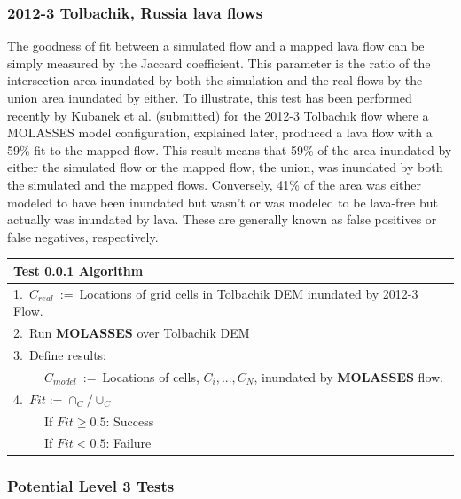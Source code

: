\documentclass[12pt,letter]{article}
\newcommand{\tabitem}{~~\llap{\textbullet}~~}
\newcommand{\tabitem}{~~\llap{\textbullet}~~}
\begin{document}
		\subsubsection{2012-3 Tolbachik, Russia lava flows}\label{test:Real_Tolbachik}
			The goodness of fit between a simulated flow and a mapped lava flow can be simply measured by the Jaccard coefficient. This parameter is the ratio of the intersection area inundated by both the simulation and the real flows by the union area inundated by either. To illustrate, this test has been performed recently by Kubanek et al. (submitted) for the 2012-3 Tolbachik flow where a MOLASSES model configuration, explained later, produced a lava flow with a 59\% fit to the mapped flow. This result means that 59\% of the area inundated by either the simulated flow or the mapped flow, the union, was inundated by both the simulated and the mapped flows. Conversely, 41\% of the area was either modeled to have been inundated but wasn't or was modeled to be lava-free but actually was inundated by lava. These are generally known as false positives or false negatives, respectively.
			

			\begin{center}
				\begin{tabular}{l}
					\toprule
					\textbf{Test \ref{test:Real_Tolbachik} Algorithm}\\
					\midrule
					1.~$C_{real}$~:=~Locations of grid cells in Tolbachik DEM inundated by 2012-3 Flow.\\
					2.~Run \textbf{MOLASSES} over Tolbachik DEM\\
					3.~Define results:\\
						~\tabitem $C_{model}$~:=~Locations of cells, $C_i,...,C_N$, inundated by \textbf{MOLASSES} flow.\\
					4.~$Fit:=\cap_C/\cup_C$\\
						~\tabitem If $Fit\ge0.5$: Success\\
						~\tabitem If $Fit<0.5$: Failure\\
					\bottomrule
				\end{tabular}
			\end{center}
			
		\subsubsection{Potential Level 3 Tests}
\end{document}
